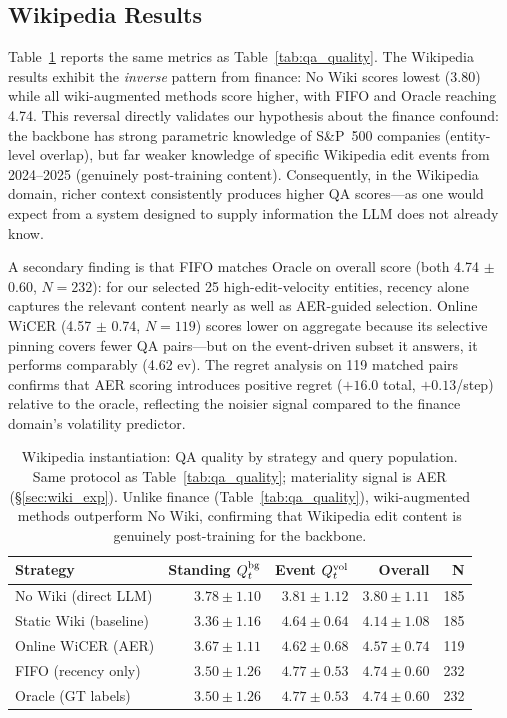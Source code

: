 \documentclass{article}
\begin{document}
\subsection{Wikipedia Results}
\label{sec:wiki_results}

Table~\ref{tab:wiki_results} reports the same metrics as Table~\ref{tab:qa_quality}.
The Wikipedia results exhibit the \emph{inverse} pattern from finance: No Wiki scores lowest (3.80) while all wiki-augmented methods score higher, with FIFO and Oracle reaching 4.74.
This reversal directly validates our hypothesis about the finance confound: the backbone has strong parametric knowledge of S\&P~500 companies (entity-level overlap), but far weaker knowledge of specific Wikipedia edit events from 2024--2025 (genuinely post-training content).
Consequently, in the Wikipedia domain, richer context consistently produces higher QA scores---as one would expect from a system designed to supply information the LLM does not already know.

A secondary finding is that FIFO matches Oracle on overall score (both 4.74 $\pm$ 0.60, $N=232$): for our selected 25 high-edit-velocity entities, recency alone captures the relevant content nearly as well as AER-guided selection.
Online WiCER (4.57 $\pm$ 0.74, $N=119$) scores lower on aggregate because its selective pinning covers fewer QA pairs---but on the event-driven subset it answers, it performs comparably (4.62 ev).
The regret analysis on 119 matched pairs confirms that AER scoring introduces positive regret ($+16.0$ total, $+0.13$/step) relative to the oracle, reflecting the noisier signal compared to the finance domain's volatility predictor.

\begin{table}[h]
\centering
\caption{Wikipedia instantiation: QA quality by strategy and query population. Same protocol as Table~\ref{tab:qa_quality}; materiality signal is AER (\S\ref{sec:wiki_exp}). Unlike finance (Table~\ref{tab:qa_quality}), wiki-augmented methods outperform No Wiki, confirming that Wikipedia edit content is genuinely post-training for the backbone.}
\label{tab:wiki_results}
\small
\begin{tabular}{@{}lrrrr@{}}
\toprule
\textbf{Strategy} & \textbf{Standing $Q_t^{\textup{bg}}$} & \textbf{Event $Q_t^{\textup{vol}}$} & \textbf{Overall} & \textbf{N} \\
\midrule
No Wiki (direct LLM)   & $3.78 \pm 1.10$ & $3.81 \pm 1.12$ & $3.80 \pm 1.11$ & 185 \\
Static Wiki (baseline) & $3.36 \pm 1.16$ & $4.64 \pm 0.64$ & $4.14 \pm 1.08$ & 185 \\
Online WiCER (AER)     & $3.67 \pm 1.11$ & $4.62 \pm 0.68$ & $4.57 \pm 0.74$ & 119 \\
FIFO (recency only)    & $3.50 \pm 1.26$ & $4.77 \pm 0.53$ & $4.74 \pm 0.60$ & 232 \\
Oracle (GT labels)     & $3.50 \pm 1.26$ & $4.77 \pm 0.53$ & $4.74 \pm 0.60$ & 232 \\
\bottomrule
\end{tabular}
\end{table}
\end{document}
